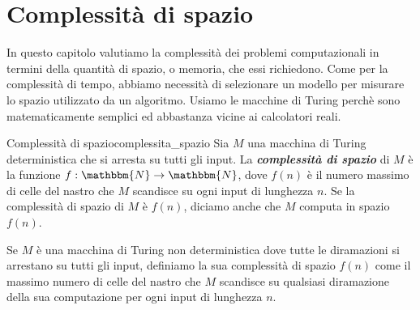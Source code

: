 \documentclass[12pt]{report}
\newcounter{definition}
\newcommand{\nmu}{}
\begin{document}
\chapter{Complessità di spazio}
In questo capitolo valutiamo la complessità dei problemi computazionali in termini della quantità di spazio, o memoria, che essi richiedono. Come per la complessità di tempo, abbiamo necessità di selezionare un modello per misurare lo spazio utilizzato da un algoritmo. Usiamo le macchine di Turing perchè sono matematicamente semplici ed abbastanza vicine ai calcolatori reali.

\begin{definition}{\nmu Complessità di spazio}{complessita_spazio}
	Sia $M$ una macchina di Turing deterministica che si arresta su tutti gli input. La \textbf{\textit{complessità di spazio}} di $M$ è la funzione $f: \mathbbm{N} \to \mathbbm{N}$, dove $f(n)$ è il numero massimo di celle del nastro che $M$ scandisce su ogni input di lunghezza $n$. Se la complessità di spazio di $M$ è $f(n)$, diciamo anche che $M$ computa in spazio $f(n)$.

	Se $M$ è una macchina di Turing non deterministica dove tutte le diramazioni si arrestano su tutti gli input, definiamo la sua complessità di spazio $f(n)$ come il massimo numero di celle del nastro che $M$ scandisce su qualsiasi diramazione della sua computazione per ogni input di lunghezza $n$.
\end{definition}
\end{document}
